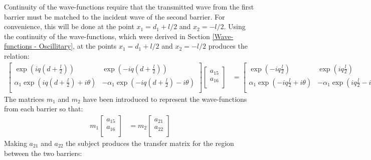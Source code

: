 \documentclass[12pt,a4paper]{report}
\begin{document}
				Continuity of the wave-functions require that the transmitted wave from the first barrier must be matched to the incident wave of the second barrier. For convenience, this will be done at the point $x_{1}=d_{1}+l/2$ and $x_{2}=-l/2$. Using the continuity of the wave-functions, which were derived in Section \ref{Wave-functions - Oscillitary}, at the points $x_{1}=d_{1}+l/2$ and $x_{2}=-l/2$ produces the relation:
				\begin{align}
					\left[\begin{array}{cc}
						\exp(iq\left(d+\frac{l}{2}\right))&\exp(-iq\left(d+\frac{l}{2}\right))\\
						\alpha_{1}\exp(iq\left(d+\frac{l}{2}\right)+i\theta)&-\alpha_{1}\exp(-iq\left(d+\frac{l}{2}\right)-i\theta)\\
					\end{array}\right]
					\left[\begin{array}{cc}
						a_{15}\\
						a_{16}\\
					\end{array}\right]
					&=
					\left[\begin{array}{cc}
						\exp(-iq\frac{l}{2})&\exp(iq\frac{l}{2})\\
						\alpha_{1}\exp(-iq\frac{l}{2}+i\theta)&-\alpha_{1}\exp(iq\frac{l}{2}-i\theta)\\
					\end{array}\right]
					\left[\begin{array}{cc}
						a_{21}\\
						a_{22}\\
					\end{array}\right]
				\end{align}
				The matrices $m_{1}$ and $m_{2}$ have been introduced to represent the wave-functions from each barrier so that:
				\begin{align}
					m_{1}
					\left[\begin{array}{cc}
						a_{15}\\
						a_{16}\\
					\end{array}\right]
					&=m_{2}
					\left[\begin{array}{cc}
						a_{21}\\
						a_{22}\\
					\end{array}\right]
				\end{align}
				Making $a_{21}$ and $a_{22}$ the subject produces the transfer matrix for the region between the two barriers:
\end{document}
